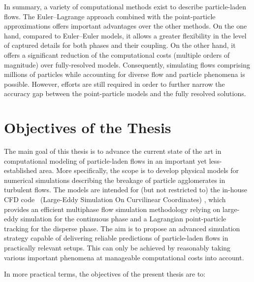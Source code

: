 In summary, a variety of computational methods exist to describe
particle-laden flows. The Euler--Lagrange approach combined with the
point-particle approximations offers important advantages over the
other methods. On the one hand, compared to Euler--Euler models, it
allows a greater flexibility in the level of captured details for both
phases and their coupling.  On the other hand, it offers a significant
reduction of the computational costs (multiple orders of magnitude)
over fully-resolved models. Consequently, simulating flows comprising
millions of particles while accounting for diverse flow and particle
phenomena is possible.  However, efforts are still required in order
to further narrow the accuracy gap between the point-particle models
and the fully resolved solutions.

\section{Objectives of the Thesis}
\label{sec:aims_objectives}

The main goal of this thesis is to advance the current state of the
art in computational modeling of particle-laden flows in an important
yet less-established area.  More specifically, the scope is to develop
physical models for numerical simulations describing the breakage of
particle agglomerates in turbulent flows. The models are intended for
(but not restricted to) the in-house CFD code \lesocc \ (Large-Eddy
Simulation On Curvilinear
Coordinates)
\citep{breuer1998,breuer1998b,breuer2000,habil2002}, which provides an
efficient multiphase flow simulation methodology relying on large-eddy
simulation for the continuous phase and a Lagrangian point-particle
tracking for the disperse phase.  The aim is to propose an advanced
simulation strategy capable of delivering reliable predictions of
particle-laden flows in practically relevant setups. This can only be
achieved by reasonably taking various important phenomena at
manageable computational costs into account.

In more practical terms, the objectives of the present thesis are to:

